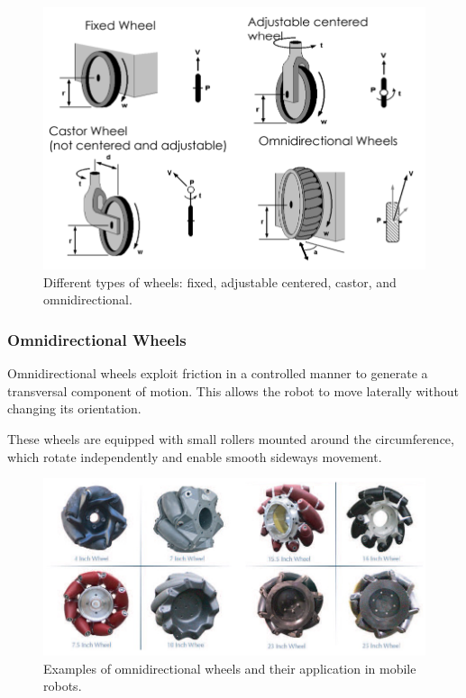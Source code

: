 \begin{figure}[H]
  \centering
  \includegraphics[width=0.9\linewidth]{imgs/types_of_wheels.png}
  \caption{Different types of wheels: fixed, adjustable centered, castor, and omnidirectional.}
\end{figure}

\subsubsection*{Omnidirectional Wheels}

Omnidirectional wheels exploit friction in a controlled manner to generate a transversal component of motion. This allows the robot to move laterally without changing its orientation.

These wheels are equipped with small rollers mounted around the circumference, which rotate independently and enable smooth sideways movement.

\begin{figure}[H]
  \centering
  \includegraphics[width=\linewidth]{imgs/omnidirectional_wheels.png}
  \caption{Examples of omnidirectional wheels and their application in mobile robots.}
\end{figure}

